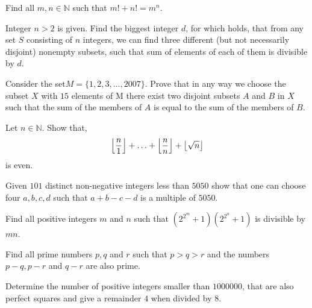 \begin{problem}[Belarus $2009$]
	Find all $m,n\in\mathbb{N}$ such that $m!+n!=m^n$.
\end{problem}

\begin{problem}
	Integer $n>2$ is given. Find the biggest integer $d$, for which holds, that from any set $S$ consisting of $n$ integers, we can find three different (but not necessarily disjoint) nonempty subsets, such that sum of elements of each of them is divisible by $d$.
\end{problem}

\begin{problem}
	Consider the set$ M = \{1, 2, 3, . . . , 2007\}$. Prove that in any way we choose the subset $X$ with $15$ elements of M there exist two disjoint subsets         $A$ and $B$ in $X$ such that the sum of the members of $A$ is equal to the sum of the members of $B$.
\end{problem}

\begin{problem}[India $2014$]
	Let $n\in\mathbb{N}$. Show that,
		\begin{align*}
			\left\lfloor{\dfrac{n}{1}}\right\rfloor+\ldots+\left\lfloor{\dfrac{n}{n}}\right\rfloor+\left\lfloor{\sqrt{n}}\right\rfloor
		\end{align*}
	is even.
\end{problem}

\begin{problem}
	Given $101$ distinct non-negative integers less than $5050$ show that one can choose four $a, b, c, d$ such that $a + b - c - d$ is a multiple of $5050$.
\end{problem}

\begin{problem}
	Find all positive integers $m$ and $n$ such that $\left(2^{2^m}+1\right)\left(2^{2^n}+1\right)$ is divisible by $mn$.
\end{problem}

\begin{problem}[Slovenia $2010$]
	Find all prime numbers $p, q$ and $r$ such that $p > q > r$ and the numbers $p-q,p-r$ and $q-r$ are also prime.
\end{problem}

\begin{problem}
	Determine the number of positive integers smaller than $1000000$, that are also perfect squares and give a remainder $4$ when divided by $8$.
\end{problem}

